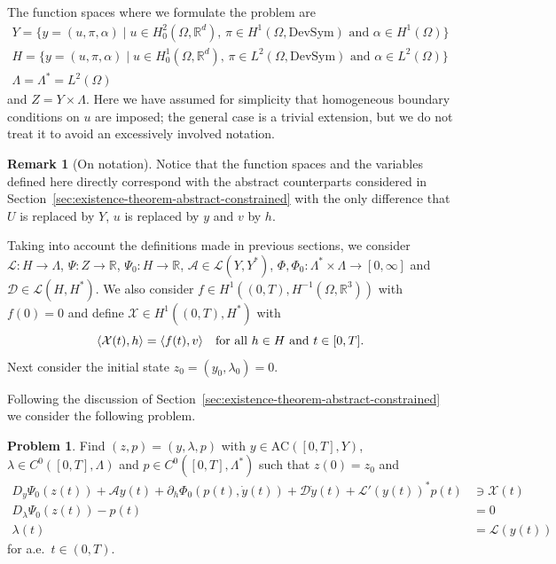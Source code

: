 \documentclass[a4paper,10pt,twoside]{amsbook}
\numberwithin{section}{chapter}
\numberwithin{equation}{chapter}
\theoremstyle{definition}
\newtheorem{rmk}[prop]{Remark}
\newtheorem{prb}[prop]{Problem}
\DeclarePairedDelimiter{\dual}{\langle}{\rangle}
\begin{document}
The function spaces where we formulate the problem are
\begin{gather}
Y=\{y=(u,\pi,\alpha)\;|\;\text{$u\in H^2_0(\Omega,\mathbb{R}^d)$, $\pi\in H^1(\Omega,\text{DevSym})$ and $\alpha\in H^1(\Omega)$}\} \\
H=\{y=(u,\pi,\alpha)\;|\;\text{$u\in H^1_0(\Omega,\mathbb{R}^d)$, $\pi\in L^2(\Omega,\text{DevSym})$ and $\alpha\in L^2(\Omega)$}\} \\
\Lambda=\Lambda^*=L^2(\Omega)
\end{gather}
and $Z=Y\times\Lambda$. Here we have assumed for simplicity that homogeneous boundary conditions on $u$ are imposed; the general case is a trivial extension, but we do not treat it to avoid an excessively involved notation.
\begin{rmk}[On notation]
Notice that the function spaces and the variables defined here directly correspond with the abstract counterparts considered in Section~\ref{sec:existence-theorem-abstract-constrained} with the only difference that $U$ is replaced by $Y$, $u$ is replaced by $y$ and $v$ by $h$.
\end{rmk}
Taking into account the definitions made in previous sections, we consider $\mathcal{L}\colon H\to\Lambda$, $\Psi\colon Z\to\mathbb{R}$, $\Psi_0\colon H\to\mathbb{R}$, $\mathcal{A}\in\mathscr{L}(Y,Y^*)$, $\Phi,\Phi_0\colon\Lambda^*\times\Lambda\to[0,\infty]$ and $\mathcal{D}\in\mathscr{L}(H,H^*)$. We also consider $f\in H^1((0,T),H^{-1}(\Omega,\mathbb{R}^3))$ with $f(0)=0$ and define $\mathcal{X}\in H^1((0,T),H^*)$ with
\[
\dual{\mathcal{X}(t),h}=\dual{f(t),v}\quad\text{for all $h\in H$ and $t\in[0,T]$}.
\]
Next consider the initial state $z_0=(y_0,\lambda_0)=0$.

Following the discussion of Section~\ref{sec:existence-theorem-abstract-constrained} we consider the following problem.
\begin{prb}
\label{prb:pressure-sensitive-small}
Find $(z,p)=(y,\lambda,p)$ with $y\in\text{AC}([0,T],Y)$, $\lambda\in C^0([0,T],\Lambda)$ and $p\in C^0([0,T],\Lambda^*)$ such that $z(0)=z_0$ and
\begin{align}
D_y\Psi_0(z(t))+\mathcal{A}y(t)+\partial_h\Phi_0(p(t),\dot y(t))+\mathcal{D}\dot y(t)+\mathcal{L}'(y(t))^*p(t)&\ni\mathcal{X}(t) \\
D_\lambda\Psi_0(z(t))-p(t)&=0 \\
\lambda(t)&=\mathcal{L}(y(t))
\end{align}
for a.e.\ $t\in(0,T)$.
\end{prb}
\end{document}
